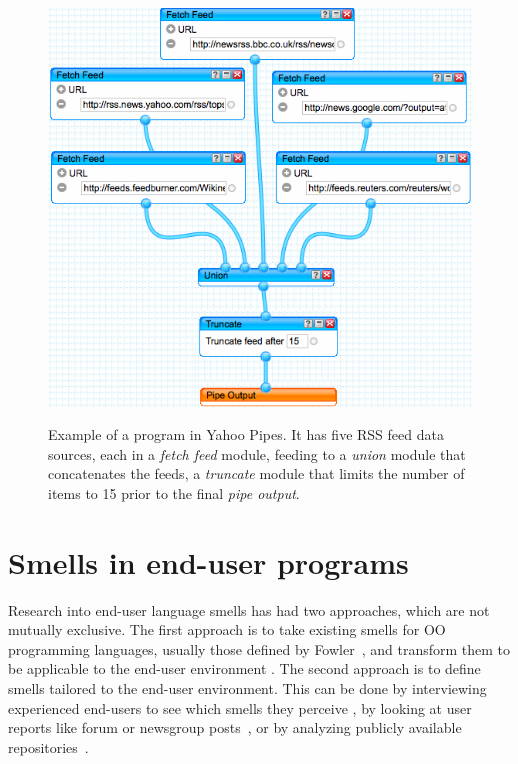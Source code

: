\documentclass{sig-alternate}
\begin{document}
\begin{figure}
\caption{Example of a program in Yahoo Pipes. It has five RSS feed data sources, each in a \emph{fetch feed} module, feeding to a \emph{union} module that concatenates the feeds, a \emph{truncate} module that limits the number of items to 15 prior to the final \emph{pipe output}. }
\centering
\includegraphics[width=\columnwidth]{img/yp-1}
\label{fig:ypexample}
\end{figure}


\section{Smells in end-user programs}
\label{sec:smells}
Research into end-user language smells has had two approaches, which are not mutually exclusive.
The first approach is to take existing smells for OO programming languages, usually those defined by Fowler~\cite{Fowl1999}, and transform them to be applicable to the end-user environment \cite{Hermans2012inter,Hermans2012intra,Stolee2011,StoleeTSE2013, chambers2013smell}.
The second approach is to define smells tailored to the end-user environment.
This can be done by interviewing experienced end-users to see which smells they perceive \cite{chambers2013smell}, by looking at user reports like forum or newsgroup posts~\cite{badame2012refactoring,chambers2013smell}, or by analyzing publicly available repositories~\cite{Stolee2011,StoleeTSE2013,Hermans2012intra}.
\end{document}
